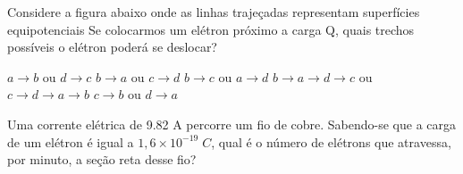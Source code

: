 \documentclass[12pt, addpoints]{exam}
\begin{document}
    \begin{questions}
\begin{multicols*}{2}
\question Considere a figura abaixo onde as linhas trajeçadas representam superfícies equipotenciais Se colocarmos um elétron próximo a carga Q, quais trechos possíveis o elétron poderá se deslocar?
        
        \begin{center}
            \begin{minipage}[c]{0.5\linewidth}
            \end{minipage}
        \end{center}
        
        

\begin{choices}
\choice $a\rightarrow b$ ou $d\rightarrow c$ 
\choice $b\rightarrow a$ ou $c\rightarrow d$ 
\choice $b\rightarrow c$ ou $a\rightarrow d$ 
\choice $b\rightarrow a\rightarrow d\rightarrow c$ ou $c\rightarrow d\rightarrow a\rightarrow b$ 
\choice $c\rightarrow b$ ou $d\rightarrow a$ 
\end{choices}
\question Uma corrente elétrica de    9.82 A percorre um ﬁo de cobre. Sabendo-se que a carga de um elétron é igual a $1,6\times 10^{-19}\;C$, qual é o número de elétrons que atravessa, por minuto, a seção reta desse ﬁo?


\end{multicols*}
\end{questions}
\end{document}
